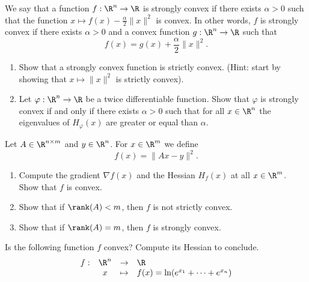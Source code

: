 \documentclass[11pt,nocut]{article}
\begin{document}
\begin{problem}[3 points]\label{prob:strongly_convex}
	We say that a function $f: \R^n \to \R$ is strongly convex if there exists $\alpha >0$ such that the function $x \mapsto f(x) - \frac{\alpha}{2} \|x\|^2$ is convex. In other words, $f$ is strongly convex if there exists $\alpha > 0$ and a convex function $g: \R^n \to \R$ such that 
	$$
	f(x) = g(x) + \frac{\alpha}{2} \|x\|^2.
	$$
	
	\begin{enumerate}[label=\normalfont(\textbf{\alph*})]
		\item Show that a strongly convex function is strictly convex. (Hint: start by showing that $x \mapsto \|x\|^2$ is strictly convex).
		\item Let $\varphi:\R^n \to \R$ be a twice differentiable function. Show that $\varphi$ is strongly convex if and only if there exists $\alpha >0$ such that for all $x \in \R^n$ the eigenvalues of $H_{\varphi}(x)$ are greater or equal than $\alpha$.
	\end{enumerate}
\end{problem}


\vspace{4mm}

\begin{problem}[3 points]
	Let $A \in \R^{n \times m}$ and $y \in \R^n$.
	For $x \in \R^m$ we define
	$$
	f(x) = \|Ax-y\|^2.
	$$
	\begin{enumerate}[label=\normalfont(\textbf{\alph*})]
		\item Compute the gradient $\nabla f(x)$ and the Hessian $H_f(x)$ at all $x \in \R^m$. Show that $f$ is convex.
		\item Show that if $\rank(A)<m$, then $f$ is not strictly convex.
		\item Show that if $\rank(A)=m$, then $f$ is strongly convex.
	\end{enumerate}
\end{problem}

\vspace{4mm}

\begin{problem}[$\star$] Is the following function $f$ convex? Compute its Hessian to conclude.
	 $$\begin{array}{cccl}
        f: & \R^n & \to & \R \\
           & x & \mapsto & f(x) = \ln(e^{x_1} + \cdots + e^{x_n})
        \end{array}$$


\end{problem}

%
%
\end{document}
